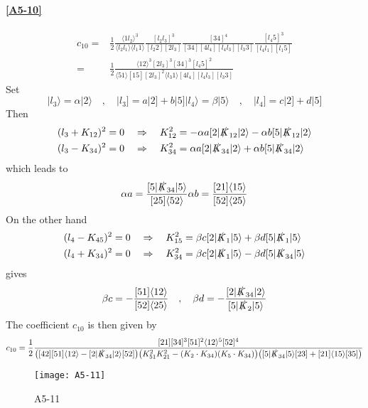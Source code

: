 \paragraph{\ref{A5-10}}
\begin{equation*}
\begin{split}
c_{10} = &
\frac{1}{2}\frac{\langle 1l_2\rangle^3}{\langle l_2 l_1 \rangle\langle l_1 1 \rangle}
\frac{[l_2 l_3]^3}{[l_2 2 ][2 l_3]}
\frac{[34]^4}{[34][4 l_4][l_4 l_3][l_3 3]}
\frac{[l_4 5]^3}{[l_4 l_1][l_1 5]}
\\
= &
\frac{1}{2}\frac{\langle 12 \rangle^3[2l_3]^3[34]^3[l_4 5 ]^2}{\langle 51 \rangle[15][2l_3]^2\langle l_3 1\rangle [4 l_4][l_4 l_3][l_3 3]}
\end{split}
\end{equation*}
Set
\begin{equation*}
|l_3\rangle = \alpha |2\rangle \quad,\quad |l_3] = a|2] + b|5]
|l_4\rangle = \beta |5\rangle \quad,\quad |l_4] = c|2]+d|5]
\end{equation*}
Then
\begin{equation*}
\begin{split}
& (l_3 + K_{12})^2 = 0 \quad\Rightarrow\quad K_{12}^2 = - \alpha a [2|\slashed{K}_{12}|2\rangle - \alpha b [5|\slashed{K}_{12}|2\rangle
\\
& (l_3 - K_{34})^2 = 0 \quad\Rightarrow\quad K_{34}^2 = \alpha a [2|\slashed{K}_{34}|2\rangle + \alpha b [5|\slashed{K}_{34}|2\rangle
\end{split}
\end{equation*}
which leads to
\begin{equation*}
\alpha a = \frac{[5|\slashed{K}_{34}|5\rangle}{[25]\langle 52\rangle}
\\
\alpha b = \frac{[21]\langle 15\rangle}{[52]\langle 25\rangle}
\end{equation*}
On the other hand
\begin{equation*}
\begin{split}
& (l_4 - K_{45})^2 = 0 \quad\Rightarrow\quad
K_{15}^2 = \beta c[2|\slashed{K}_1|5\rangle + \beta d [5|\slashed{K}_1|5\rangle
\\
& (l_4 + K_{34})^2 = 0 \quad\Rightarrow\quad
K_{34}^2 = \beta c [2|\slashed{K}_1|5\rangle - \beta d [5|\slashed{K}_{34}|5\rangle
\end{split}
\end{equation*}
gives
\begin{equation*}
\beta c = - \frac{[51]\langle 12 \rangle}{[52]\langle 25 \rangle}
\quad,\quad
\beta d = - \frac{[2| \slashed{K}_{34}|2\rangle}{[5|\slashed{K}_2|5\rangle}
\end{equation*}
The coefficient $c_{10}$ is then given by
\begin{equation*}
c_{10} = \frac{1}{2}\frac{[21][34]^3[51]^2\langle 12\rangle^5 [52]^4}{\big([42][51]\langle 12\rangle - [2|\slashed{K}_{34}|2\rangle [52]\big)
\big( K_{51}^2 K_{21}^2 - (K_2\cdot K_{34})(K_5\cdot K_{34})\big)
\big( [5|\slashed{K}_{34}|5\rangle [23] + [21]\langle 15\rangle [35]\big)
}
\end{equation*}
%
%
\begin{figure}
  \centering
    \texttt{[image: A5-11]}
    \caption{A5-11}
  \label{A5-11}
\end{figure}
